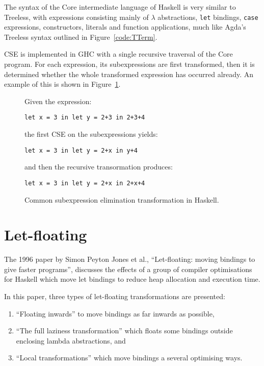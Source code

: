 The syntax of the Core intermediate language of Haskell is very similar to Treeless, with expressions consisting mainly of $\lambda$ abstractions, \lstinline{let} bindings, \lstinline{case} expressions, constructors, literals and function applications, much like Agda's Treeless syntax outlined in Figure~\ref{code:TTerm}.

CSE is implemented in GHC with a single recursive traversal of the Core program. For each expression, its subexpressions are first transformed, then it is determined whether the whole transformed expression has occurred already.\cite{chitil1997} An example of this is shown in Figure~\ref{code:cse_haskell}.

\begin{figure}[h]
Given the expression:

\lstinline{let x = 3 in let y = 2+3 in 2+3+4}

the first CSE on the subexpressions yields:

\lstinline{let x = 3 in let y = 2+x in y+4}

and then the recursive transormation produces:

\lstinline{let x = 3 in let y = 2+x in 2+x+4}

\caption{Common subexpression elimination transformation in Haskell.\cite{chitil1997}}
\label{code:cse_haskell}
\end{figure}

\section{Let-floating}
\label{sec:let_floating}

The 1996 paper by Simon Peyton Jones et al., ``Let-floating: moving bindings to give faster programs'', discusses the effects of a group of compiler optimisations for Haskell which move let bindings to reduce heap allocation and execution time.\cite{jones1996}

In this paper, three types of let-floating transformations are presented:
\begin{enumerate}
\item ``Floating inwards'' to move bindings as far inwards as possible,
\item ``The full laziness transformation'' which floats some bindings outside enclosing lambda abstractions, and
\item ``Local transformations'' which move bindings a several optimising ways.\cite{jones1996}
\end{enumerate}

